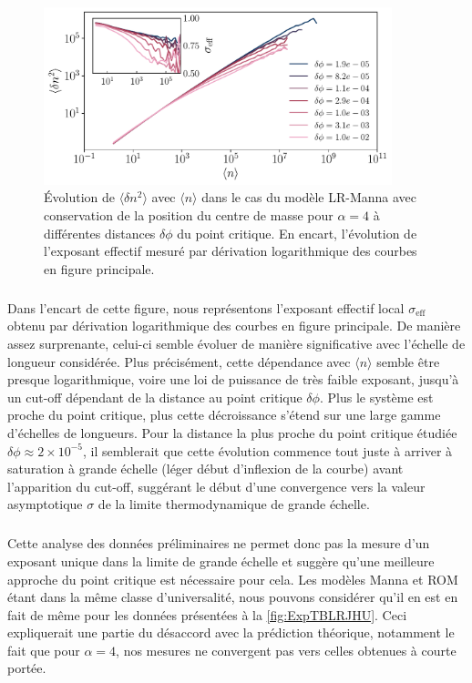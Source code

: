 \begin{figure}[h]
	\centering
	\includegraphics[width=0.9\textwidth]{Chapitre2/Figures/Hyperuniformity/MannaCM_gamma4_results.pdf}
	\caption{Évolution de $\langle \delta n^2 \rangle$ avec $\langle n \rangle$ dans le cas du modèle LR-Manna avec conservation de la position du centre de masse pour $\alpha=4$ à différentes distances $\delta\phi$ du point critique. En encart, l'évolution de l'exposant effectif mesuré par dérivation logarithmique des courbes en figure principale.}
	\label{fig:MannaCMHU_gamma4}
\end{figure}

\subparagraph{}Dans l'encart de cette figure, nous représentons l'exposant effectif local $\sigma_\text{eff}$ obtenu par dérivation logarithmique des courbes en figure principale. De manière assez surprenante, celui-ci semble évoluer de manière significative avec l'échelle de longueur considérée. Plus précisément, cette dépendance avec $\langle n \rangle$ semble être presque logarithmique, voire une loi de puissance de très faible exposant, jusqu'à un cut-off dépendant de la distance au point critique $\delta\phi$. Plus le système est proche du point critique, plus cette décroissance s'étend sur une large gamme d'échelles de longueurs. Pour la distance la plus proche du point critique étudiée $\delta\phi\approx 2\times 10^{-5}$, il semblerait que cette évolution commence tout juste à arriver à saturation à grande échelle (léger début d'inflexion de la courbe) avant l'apparition du cut-off, suggérant le début d'une convergence vers la valeur asymptotique $\sigma$ de la limite thermodynamique de grande échelle.

\subparagraph{}Cette analyse des données préliminaires ne permet donc pas la mesure d'un exposant unique dans la limite de grande échelle et suggère qu'une meilleure approche du point critique est nécessaire pour cela. Les modèles Manna et ROM étant dans la même classe d'universalité, nous pouvons considérer qu'il en est en fait de même pour les données présentées à la \autoref{fig:ExpTBLRJHU}. Ceci expliquerait une partie du désaccord avec la prédiction théorique, notamment le fait que pour $\alpha=4$, nos mesures ne convergent pas vers celles obtenues à courte portée.

